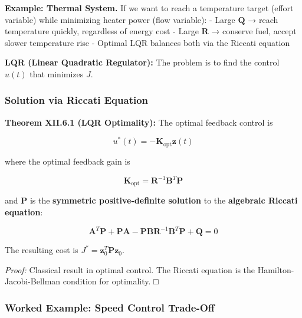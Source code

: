 \documentclass[
]{article}
\begin{document}
\begin{tcolorbox}[enhanced jigsaw, left=2mm, bottomrule=.15mm, titlerule=0mm, rightrule=.15mm, leftrule=.75mm, colframe=quarto-callout-tip-color-frame, opacitybacktitle=0.6, colbacktitle=quarto-callout-tip-color!10!white, bottomtitle=1mm, breakable, coltitle=black, toptitle=1mm, arc=.35mm, colback=white, title=\textcolor{quarto-callout-tip-color}{\faLightbulb}\hspace{0.5em}{Tip}, opacityback=0, toprule=.15mm]

\textbf{Example: Thermal System.} If we want to reach a temperature
target (effort variable) while minimizing heater power (flow variable):
- Large \(\mathbf{Q}\) → reach temperature quickly, regardless of energy
cost - Large \(\mathbf{R}\) → conserve fuel, accept slower temperature
rise - Optimal LQR balances both via the Riccati equation

\end{tcolorbox}

\textbf{LQR (Linear Quadratic Regulator):} The problem is to find the
control \(u(t)\) that minimizes \(J\).

\subsubsection{Solution via Riccati
Equation}\label{solution-via-riccati-equation}

\textbf{Theorem XII.6.1 (LQR Optimality):} The optimal feedback control
is

\[u^*(t) = -\mathbf{K}_{\text{opt}}\mathbf{z}(t)\]

where the optimal feedback gain is

\[\mathbf{K}_{\text{opt}} = \mathbf{R}^{-1}\mathbf{B}^T\mathbf{P}\]

and \(\mathbf{P}\) is the \textbf{symmetric positive-definite solution}
to the \textbf{algebraic Riccati equation}:

\[\mathbf{A}^T\mathbf{P} + \mathbf{P}\mathbf{A} - \mathbf{P}\mathbf{B}\mathbf{R}^{-1}\mathbf{B}^T\mathbf{P} + \mathbf{Q} = 0\]

The resulting cost is \(J^* = \mathbf{z}_0^T \mathbf{P}\mathbf{z}_0\).

\emph{Proof:} Classical result in optimal control. The Riccati equation
is the Hamilton-Jacobi-Bellman condition for optimality. □

\subsubsection{Worked Example: Speed Control
Trade-Off}\label{worked-example-speed-control-trade-off}
\end{document}
